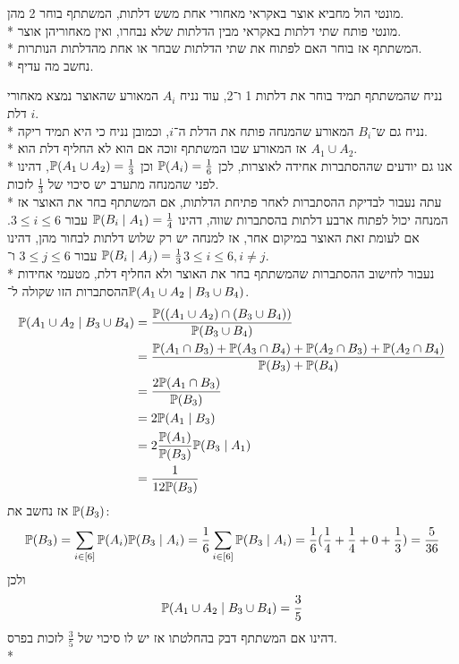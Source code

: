 \Question{}
מונטי הול מחביא אוצר באקראי מאחורי אחת משש דלתות, המשתתף בוחר 2 מהן. \\*
מונטי פותח שתי דלתות באקראי מבין הדלתות שלא נבחרו, ואין מאחוריהן אוצר. \\*
המשתתף אז בוחר האם לפתוח את שתי הדלתות שבחר או אחת מהדלתות הנותרות. \\*
נחשב מה עדיף.
\begin{solution}
	נניח שהמשתתף תמיד בוחר את דלתות 1 ו־2, עוד נניח $A_i$ המאורע שהאוצר נמצא מאחורי דלת $i$. \\*
	נניח גם ש־$B_i$ המאורע שהמנחה פותח את הדלת ה־$i$, וכמובן נניח כי היא תמיד ריקה. \\*
	אז המאורע שבו המשתתף זוכה אם הוא לא החליף דלת הוא $A_1 \cup A_2$. \\*
	אנו גם יודעים שההסתברות אחידה לאוצרות, לכן $\mathbb{P}(A_i) = \frac{1}{6}$ וכן $\mathbb{P}(A_1 \cup A_2) = \frac{1}{3}$, דהינו לפני שהמנחה מתערב יש סיכוי של $\frac{1}{3}$ לזכות. \\*
	עתה נעבור לבדיקת ההסתברות לאחר פתיחת הדלתות, אם המשתתף בחר את האוצר אז המנחה יכול לפתוח ארבע דלתות בהסתברות שווה, דהינו $\mathbb{P}(B_i \mid A_1) = \frac{1}{4}$ עבור $3 \le i \le 6$.
	אם לעומת זאת האוצר במיקום אחר, אז למנחה יש רק שלוש דלתות לבחור מהן, דהינו $\mathbb{P}(B_i \mid A_j) = \frac{1}{3}$ עבור $3 \le j \le 6$ ו־$3 \le i \le 6, i \ne j$. \\*
	נעבור לחישוב ההסתברות שהמשתתף בחר את האוצר ולא החליף דלת, מטעמי אחידות ההסתברות הזו שקולה ל־$\mathbb{P}(A_1 \cup A_2 \mid B_3 \cup B_4)$.
	\begin{align*}
		\mathbb{P}(A_1 \cup A_2 \mid B_3 \cup B_4)
		& = \frac{\mathbb{P}((A_1 \cup A_2) \cap (B_3 \cup B_4))}{\mathbb{P}(B_3 \cup B_4)} \\
		& = \frac{\mathbb{P}(A_1 \cap B_3) + \mathbb{P}(A_3 \cap B_4) + \mathbb{P}(A_2 \cap B_3) + \mathbb{P}(A_2 \cap B_4)}{\mathbb{P}(B_3) + \mathbb{P}(B_4)} \\
		& = \frac{2 \mathbb{P}(A_1 \cap B_3)}{\mathbb{P}(B_3)} \\
		& = 2 \mathbb{P}(A_1 \mid B_3) \\
		& = 2 \frac{\mathbb{P}(A_1)}{\mathbb{P}(B_3)} \mathbb{P}(B_3 \mid A_1) \\
		& = \frac{1}{12 \mathbb{P}(B_3)}
	\end{align*}
	אז נחשב את $\mathbb{P}(B_3)$:
	\[
		\mathbb{P}(B_3)
		= \sum_{i \in [6]} \mathbb{P}(A_i) \mathbb{P}(B_3 \mid A_i)
		= \frac{1}{6} \sum_{i \in [6]} \mathbb{P}(B_3 \mid A_i)
		= \frac{1}{6}(\frac{1}{4} + \frac{1}{4} + 0 + \frac{1}{3})
		= \frac{5}{36}
	\]
	ולכן
	\[
		\mathbb{P}(A_1 \cup A_2 \mid B_3 \cup B_4)
		= \frac{3}{5}
	\]
	דהינו אם המשתתף דבק בהחלטתו אז יש לו סיכוי של $\frac{3}{5}$ לזכות בפרס. \\*

\end{solution}
